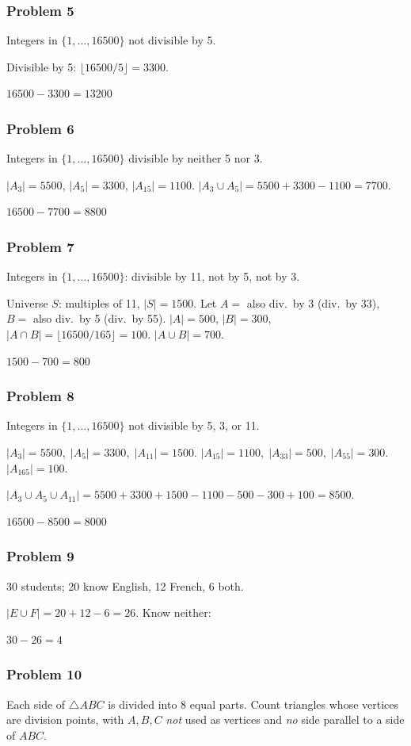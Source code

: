 \subsubsection*{Problem 5}
Integers in $\{1,\dots,16500\}$ not divisible by 5.

Divisible by 5: $\lfloor 16500/5\rfloor = 3300$.

$\boxed{16500-3300=13200}$

\subsubsection*{Problem 6}
Integers in $\{1,\dots,16500\}$ divisible by neither 5 nor 3.

$|A_3|=5500$, $|A_5|=3300$, $|A_{15}|=1100$.
$|A_3\cup A_5|=5500+3300-1100=7700$.

$\boxed{16500-7700=8800}$

\subsubsection*{Problem 7}
Integers in $\{1,\dots,16500\}$: divisible by 11, not by 5, not by 3.

Universe $S$: multiples of 11, $|S|=1500$. Let $A=$ also div.\ by 3 (div.\ by 33), $B=$ also div.\ by 5 (div.\ by 55).
$|A|=500$, $|B|=300$, $|A\cap B|=\lfloor 16500/165\rfloor=100$.
$|A\cup B|=700$.

$\boxed{1500-700=800}$

\subsubsection*{Problem 8}
Integers in $\{1,\dots,16500\}$ not divisible by 5, 3, or 11.

$|A_3|=5500,\;|A_5|=3300,\;|A_{11}|=1500$.
$|A_{15}|=1100,\;|A_{33}|=500,\;|A_{55}|=300$.
$|A_{165}|=100$.

$|A_3\cup A_5\cup A_{11}|=5500+3300+1500-1100-500-300+100=8500$.

$\boxed{16500-8500=8000}$

\subsubsection*{Problem 9}
30 students; 20 know English, 12 French, 6 both.

$|E\cup F|=20+12-6=26$. Know neither:

$\boxed{30-26=4}$

\subsubsection*{Problem 10}
Each side of $\triangle ABC$ is divided into 8 equal parts. Count triangles whose vertices are division points, with $A,B,C$ \emph{not} used as vertices and \emph{no} side parallel to a side of $ABC$.

